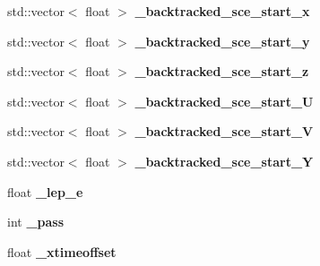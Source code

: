 \begin{DoxyCompactItemize}
\item 
\hypertarget{classanalysis_1_1DefaultAnalysis_afdabbd040efc854e13c7ccf3eeacddad}{std\-::vector$<$ float $>$ {\bfseries \-\_\-backtracked\-\_\-sce\-\_\-start\-\_\-x}}\label{classanalysis_1_1DefaultAnalysis_afdabbd040efc854e13c7ccf3eeacddad}

\item 
\hypertarget{classanalysis_1_1DefaultAnalysis_ae8a81730469f514b45b6409cc355adf2}{std\-::vector$<$ float $>$ {\bfseries \-\_\-backtracked\-\_\-sce\-\_\-start\-\_\-y}}\label{classanalysis_1_1DefaultAnalysis_ae8a81730469f514b45b6409cc355adf2}

\item 
\hypertarget{classanalysis_1_1DefaultAnalysis_a345d624aef30f05f73dde87227344042}{std\-::vector$<$ float $>$ {\bfseries \-\_\-backtracked\-\_\-sce\-\_\-start\-\_\-z}}\label{classanalysis_1_1DefaultAnalysis_a345d624aef30f05f73dde87227344042}

\item 
\hypertarget{classanalysis_1_1DefaultAnalysis_a127d8055a89ff2d84da7ac13b66040fc}{std\-::vector$<$ float $>$ {\bfseries \-\_\-backtracked\-\_\-sce\-\_\-start\-\_\-\-U}}\label{classanalysis_1_1DefaultAnalysis_a127d8055a89ff2d84da7ac13b66040fc}

\item 
\hypertarget{classanalysis_1_1DefaultAnalysis_a60a91d117c7af7c232740f0b7292cbfc}{std\-::vector$<$ float $>$ {\bfseries \-\_\-backtracked\-\_\-sce\-\_\-start\-\_\-\-V}}\label{classanalysis_1_1DefaultAnalysis_a60a91d117c7af7c232740f0b7292cbfc}

\item 
\hypertarget{classanalysis_1_1DefaultAnalysis_a519529d1530781d609bd26587d74fca3}{std\-::vector$<$ float $>$ {\bfseries \-\_\-backtracked\-\_\-sce\-\_\-start\-\_\-\-Y}}\label{classanalysis_1_1DefaultAnalysis_a519529d1530781d609bd26587d74fca3}

\item 
\hypertarget{classanalysis_1_1DefaultAnalysis_ab00e533228597e83340a23d04b986086}{float {\bfseries \-\_\-lep\-\_\-e}}\label{classanalysis_1_1DefaultAnalysis_ab00e533228597e83340a23d04b986086}

\item 
\hypertarget{classanalysis_1_1DefaultAnalysis_a8d58d05d4b0750a67babff41beece3ac}{int {\bfseries \-\_\-pass}}\label{classanalysis_1_1DefaultAnalysis_a8d58d05d4b0750a67babff41beece3ac}

\item 
\hypertarget{classanalysis_1_1DefaultAnalysis_a6ab8489552ea4bfceb0301df80100c65}{float {\bfseries \-\_\-xtimeoffset}}\label{classanalysis_1_1DefaultAnalysis_a6ab8489552ea4bfceb0301df80100c65}


\end{DoxyCompactItemize}
